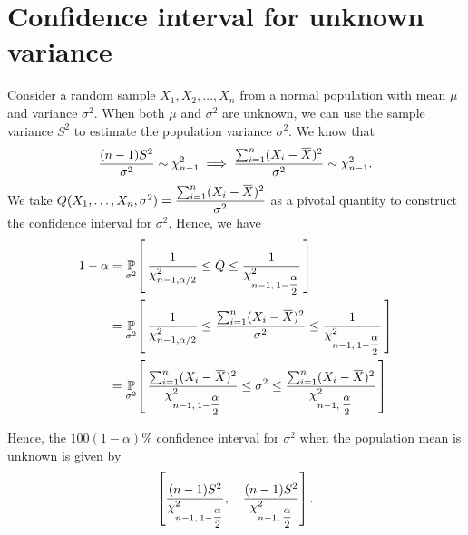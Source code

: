 \section{Confidence interval for unknown variance}

Consider a random sample $X_1, X_2, \ldots, X_n$ from a normal population with mean $\mu$ and variance $\sigma^2$. 
When both $\mu$ and $\sigma^2$ are unknown, we can use the sample variance $S^2$ to estimate the population variance $\sigma^2$.
We know that 
\[
\frac{(n-1)S^2}{\sigma^2} \sim \chi^2_{n-1} \implies \frac{\sum^n_{i=1} (X_i - \ols{X})^2}{\sigma^2} \sim \chi^2_{n-1}. 
\]
We take $Q(X_1, \ldots, X_n, \sigma^2) = \displaystyle \frac{\sum^n_{i=1} (X_i - \ols{X})^2}{\sigma^2}$ as a pivotal quantity to construct
the confidence interval for $\sigma^2$. Hence, we have 
\begin{align*}
    1 - \alpha &= \uprob[\sigma^2]{\frac{1}{\chi^2_{n-1, \alpha / 2}} \leq Q \leq \frac{1}{\chi^2_{n-1,\> 1 - \mfrac{\alpha}{2} }} }\\
    &= \uprob[\sigma^2]{ \frac{1}{\chi^2_{n-1, \alpha / 2}} \leq \frac{\sum^n_{i=1} (X_i - \ols{X})^2}{\sigma^2} \leq \frac{1}{\chi^2_{n-1,\> 1 - \mfrac{\alpha}{2} }} }\\
    &= \uprob[\sigma^2]{ \frac{\sum^n_{i=1} (X_i - \ols{X})^2}{\chi^2_{n-1,\> 1 - \mfrac{\alpha}{2}}} \leq \sigma^2 \leq \frac{\sum^n_{i=1} (X_i - \ols{X})^2}{\chi^2_{n-1,\> \mfrac{\alpha}{2} }} }
\end{align*}

Hence, the $100(1 - \alpha)\%$ confidence interval for $\sigma^2$ when the population mean is unknown is given by 
\[
\left[ \frac{(n-1)S^2}{\chi^2_{n-1,\> 1 - \mfrac{\alpha}{2}}} ,\quad \frac{(n-1)S^2}{\chi^2_{n-1,\> \mfrac{\alpha}{2}}} \right].
\]